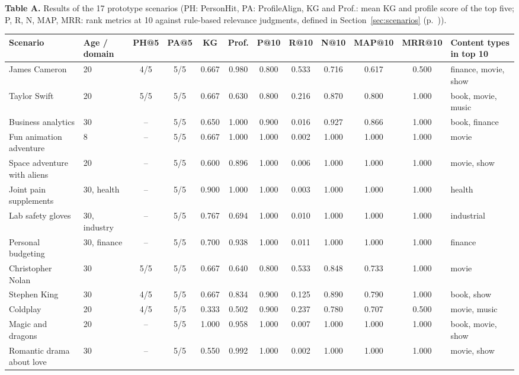 \documentclass[10pt]{article}
\let\colrule\midrule
\newcommand{\sect}[1]{Section~\ref{#1} (p.~\pageref{#1})}
\begin{document}
\begin{center}
\scriptsize
\textbf{Table A.} Results of the 17 prototype scenarios (PH: PersonHit, PA: ProfileAlign, KG and Prof.: mean KG and profile score of the top five; P, R, N, MAP, MRR: rank metrics at 10 against rule-based relevance judgments, defined in \sect{sec:scenarios}).\\[3pt]
\setlength{\tabcolsep}{3pt}
\begin{tabular*}{\linewidth}{@{\extracolsep{\fill}}llcccccccccl@{}}
\toprule
Scenario & Age / domain & PH@5 & PA@5 & KG & Prof. & P@10 & R@10 & N@10 & MAP@10 & MRR@10 & Content types in top 10 \\
\colrule
James Cameron & 20 & 4/5 & 5/5 & 0.667 & 0.980 & 0.800 & 0.533 & 0.716 & 0.617 & 0.500 & finance, movie, show \\
Taylor Swift & 20 & 5/5 & 5/5 & 0.667 & 0.630 & 0.800 & 0.216 & 0.870 & 0.800 & 1.000 & book, movie, music \\
Business analytics & 30 & -- & 5/5 & 0.650 & 1.000 & 0.900 & 0.016 & 0.927 & 0.866 & 1.000 & book, finance \\
Fun animation adventure & 8 & -- & 5/5 & 0.667 & 1.000 & 1.000 & 0.002 & 1.000 & 1.000 & 1.000 & movie \\
Space adventure with aliens & 20 & -- & 5/5 & 0.600 & 0.896 & 1.000 & 0.006 & 1.000 & 1.000 & 1.000 & movie, show \\
Joint pain supplements & 30, health & -- & 5/5 & 0.900 & 1.000 & 1.000 & 0.003 & 1.000 & 1.000 & 1.000 & health \\
Lab safety gloves & 30, industry & -- & 5/5 & 0.767 & 0.694 & 1.000 & 0.010 & 1.000 & 1.000 & 1.000 & industrial \\
Personal budgeting & 30, finance & -- & 5/5 & 0.700 & 0.938 & 1.000 & 0.011 & 1.000 & 1.000 & 1.000 & finance \\
Christopher Nolan & 30 & 5/5 & 5/5 & 0.667 & 0.640 & 0.800 & 0.533 & 0.848 & 0.733 & 1.000 & movie \\
Stephen King & 30 & 4/5 & 5/5 & 0.667 & 0.834 & 0.900 & 0.125 & 0.890 & 0.790 & 1.000 & book, show \\
Coldplay & 20 & 4/5 & 5/5 & 0.333 & 0.502 & 0.900 & 0.237 & 0.780 & 0.707 & 0.500 & movie, music \\
Magic and dragons & 20 & -- & 5/5 & 1.000 & 0.958 & 1.000 & 0.007 & 1.000 & 1.000 & 1.000 & book, movie, show \\
Romantic drama about love & 30 & -- & 5/5 & 0.550 & 0.992 & 1.000 & 0.002 & 1.000 & 1.000 & 1.000 & movie, show \\

\end{tabular*}
\end{center}
\end{document}

